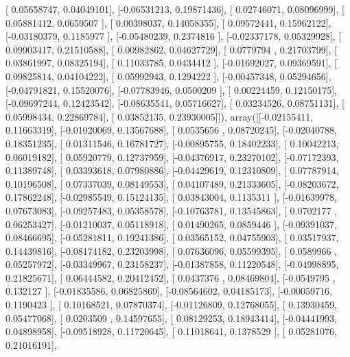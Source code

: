\documentclass{article}
\begin{document}
       [ 0.05658747,  0.04049101],
       [-0.06531213,  0.19871436],
       [ 0.02746071,  0.08096999],
       [ 0.05881412,  0.0659507 ],
       [ 0.00398037,  0.14058355],
       [ 0.09572441,  0.15962122],
       [-0.03180379,  0.1185977 ],
       [-0.05480239,  0.2374816 ],
       [-0.02337178,  0.05329928],
       [ 0.09903417,  0.21510588],
       [ 0.00982862,  0.04627729],
       [ 0.0779794 ,  0.21703799],
       [ 0.03861997,  0.08325194],
       [ 0.11033785,  0.0434412 ],
       [-0.01692027,  0.09369591],
       [ 0.09825814,  0.04104222],
       [ 0.05992943,  0.1294222 ],
       [-0.00457348,  0.05294656],
       [-0.04791821,  0.15520076],
       [-0.07783946,  0.0500209 ],
       [ 0.00224459,  0.12150175],
       [-0.09697244,  0.12423542],
       [-0.08635541,  0.05716627],
       [ 0.03234526,  0.08751131],
       [ 0.05998434,  0.22869784],
       [ 0.03852135,  0.23930005]]), array([[-0.02155411,  0.11663319],
       [-0.01020069,  0.13567688],
       [ 0.0535656 ,  0.08720245],
       [-0.02040788,  0.18351235],
       [ 0.01311546,  0.16781727],
       [-0.00895755,  0.18402233],
       [ 0.10042213,  0.06019182],
       [ 0.05920779,  0.12737959],
       [-0.04376917,  0.23270102],
       [-0.07172393,  0.11389748],
       [ 0.03393618,  0.07980886],
       [-0.04429619,  0.12310809],
       [ 0.07787914,  0.10196508],
       [ 0.07337039,  0.08149553],
       [ 0.04107489,  0.21333605],
       [-0.08203672,  0.17862248],
       [-0.02985549,  0.15124135],
       [ 0.03843004,  0.1135311 ],
       [-0.01639978,  0.07673083],
       [-0.09257483,  0.05358578],
       [-0.10763781,  0.13545863],
       [ 0.0702177 ,  0.06253427],
       [-0.01210037,  0.05118918],
       [ 0.01490265,  0.0859446 ],
       [-0.09391037,  0.08466695],
       [-0.05281811,  0.19241386],
       [ 0.03565152,  0.04755903],
       [ 0.03517937,  0.14439816],
       [-0.08174182,  0.23203998],
       [ 0.07636096,  0.05599395],
       [ 0.0589966 ,  0.05257972],
       [-0.03349967,  0.23158237],
       [-0.01387858,  0.11220548],
       [-0.04998895,  0.21825671],
       [ 0.06444582,  0.20412452],
       [ 0.0437376 ,  0.08469804],
       [-0.0549795 ,  0.132127  ],
       [-0.01835586,  0.06825869],
       [-0.08564602,  0.04185173],
       [-0.00059716,  0.1190423 ],
       [ 0.10168521,  0.07870374],
       [-0.01126809,  0.12768055],
       [ 0.13930459,  0.05477068],
       [ 0.0203509 ,  0.14597655],
       [ 0.08129253,  0.18943414],
       [-0.04441993,  0.04898958],
       [-0.09518928,  0.11720645],
       [ 0.11018641,  0.1378529 ],
       [ 0.05281076,  0.21016191],
\end{document}
